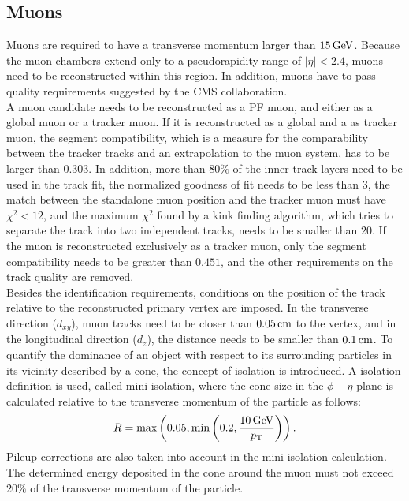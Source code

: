 \subsection{Muons}
Muons are required to have a transverse momentum larger than $15\,\text{Ge\hspace{-.08em}V}$. Because the muon chambers extend only to a pseudorapidity range of $|\eta|<2.4$, muons need to be reconstructed within this region. In addition, muons have to pass quality requirements suggested by the CMS collaboration\cite{MuonIDPerf}.\\
A muon candidate needs to be reconstructed as a PF muon, and either as a global muon or a tracker muon. If it is reconstructed as a global and a as tracker muon, the segment compatibility, which is a measure for the comparability between the tracker tracks and an extrapolation to the muon system, has to be larger than $0.303$. In addition, more than $80\%$ of the inner track layers need to be used in the track fit, the normalized goodness of fit needs to be less than $3$, the match between the standalone muon position and the tracker muon must have $\chi^2<12$, and the maximum $\chi^2$ found by a kink finding algorithm, which tries to separate the track into two independent tracks, needs to be smaller than $20$. If the muon is reconstructed exclusively as a tracker muon, only the segment compatibility needs to be greater than $0.451$, and the other requirements on the track quality are removed.\\
Besides the identification requirements, conditions on the position of the track relative to the reconstructed primary vertex are imposed. In the transverse direction ($d_{xy}$), muon tracks need to be closer than $0.05\,\text{cm}$ to the vertex, and in the longitudinal direction ($d_z$), the distance needs to be smaller than $0.1\,\text{cm}$. To quantify the dominance of an object with respect to its surrounding particles in its vicinity described by a cone, the concept of isolation is introduced. A isolation definition is used, called mini isolation, where the cone size in the $\phi-\eta$ plane is calculated relative to the transverse momentum of the particle as follows:
\begin{equation}
 R = \text{max}\left(0.05,\text{min}\left(0.2,\frac{10\,\text{Ge\hspace{-.08em}V}}{p_{\mathrm{T}}}\right)\right).
\end{equation}
Pileup corrections are also taken into account in the mini isolation calculation.
The determined energy deposited in the cone around the muon must not exceed $20\%$ of the transverse momentum of the particle.


